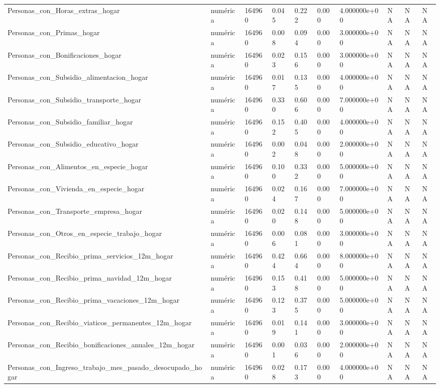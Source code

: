 \begin{longtable}[t]{llllllllll}
Personas\_con\_Horas\_extras\_hogar & numérica & 164960 & 0.045 & 0.222 & 0.000 & 4.000000e+00 & NA & NA & NA\\
Personas\_con\_Primas\_hogar & numérica & 164960 & 0.008 & 0.094 & 0.000 & 3.000000e+00 & NA & NA & NA\\
Personas\_con\_Bonificaciones\_hogar & numérica & 164960 & 0.023 & 0.156 & 0.000 & 3.000000e+00 & NA & NA & NA\\
Personas\_con\_Subsidio\_alimentacion\_hogar & numérica & 164960 & 0.017 & 0.135 & 0.000 & 4.000000e+00 & NA & NA & NA\\
Personas\_con\_Subsidio\_transporte\_hogar & numérica & 164960 & 0.330 & 0.606 & 0.000 & 7.000000e+00 & NA & NA & NA\\
Personas\_con\_Subsidio\_familiar\_hogar & numérica & 164960 & 0.152 & 0.405 & 0.000 & 4.000000e+00 & NA & NA & NA\\
Personas\_con\_Subsidio\_educativo\_hogar & numérica & 164960 & 0.002 & 0.048 & 0.000 & 2.000000e+00 & NA & NA & NA\\
Personas\_con\_Alimentos\_en\_especie\_hogar & numérica & 164960 & 0.100 & 0.332 & 0.000 & 5.000000e+00 & NA & NA & NA\\
Personas\_con\_Vivienda\_en\_especie\_hogar & numérica & 164960 & 0.024 & 0.167 & 0.000 & 7.000000e+00 & NA & NA & NA\\
Personas\_con\_Transporte\_empresa\_hogar & numérica & 164960 & 0.020 & 0.148 & 0.000 & 5.000000e+00 & NA & NA & NA\\
Personas\_con\_Otros\_en\_especie\_trabajo\_hogar & numérica & 164960 & 0.006 & 0.081 & 0.000 & 3.000000e+00 & NA & NA & NA\\
Personas\_con\_Recibio\_prima\_servicios\_12m\_hogar & numérica & 164960 & 0.424 & 0.664 & 0.000 & 8.000000e+00 & NA & NA & NA\\
Personas\_con\_Recibio\_prima\_navidad\_12m\_hogar & numérica & 164960 & 0.153 & 0.418 & 0.000 & 5.000000e+00 & NA & NA & NA\\
Personas\_con\_Recibio\_prima\_vacaciones\_12m\_hogar & numérica & 164960 & 0.123 & 0.375 & 0.000 & 5.000000e+00 & NA & NA & NA\\
Personas\_con\_Recibio\_viaticos\_permanentes\_12m\_hogar & numérica & 164960 & 0.019 & 0.141 & 0.000 & 3.000000e+00 & NA & NA & NA\\
Personas\_con\_Recibio\_bonificaciones\_anuales\_12m\_hogar & numérica & 164960 & 0.001 & 0.036 & 0.000 & 2.000000e+00 & NA & NA & NA\\
Personas\_con\_Ingreso\_trabajo\_mes\_pasado\_desocupado\_hogar & numérica & 164960 & 0.028 & 0.173 & 0.000 & 4.000000e+00 & NA & NA & NA\\

\end{longtable}
